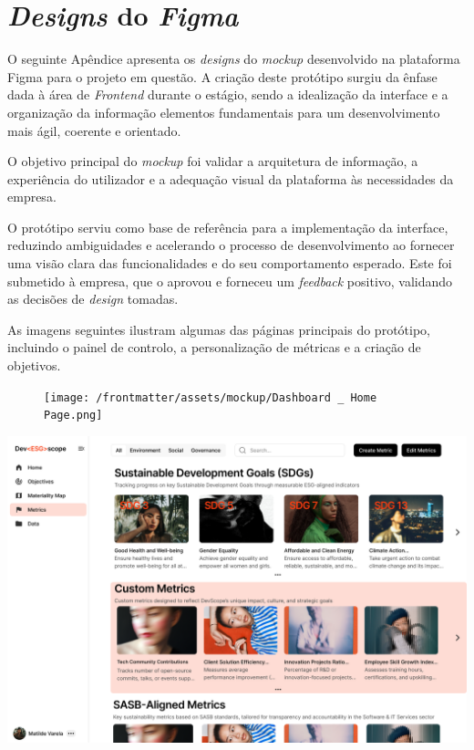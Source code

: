 \chapter{\textit{Designs} do \textit{Figma}}
\label{AppendixC}

O seguinte Apêndice apresenta os \textit{designs} do \textit{mockup}  desenvolvido na plataforma Figma para o projeto em questão. A criação deste protótipo surgiu da ênfase dada à área de \textit{Frontend} durante o estágio, sendo a idealização da interface e a organização da informação elementos fundamentais para um desenvolvimento mais ágil, coerente e orientado.

O objetivo principal do \textit{mockup} foi validar a arquitetura de informação, a experiência do utilizador e a adequação visual da plataforma às necessidades da empresa.

O protótipo serviu como base de referência para a implementação da interface, reduzindo ambiguidades e acelerando o processo de desenvolvimento ao fornecer uma visão clara das funcionalidades e do seu comportamento esperado. Este foi submetido à empresa, que o aprovou e forneceu um \textit{feedback} positivo, validando as decisões de \textit{design} tomadas.

As imagens seguintes ilustram algumas das páginas principais do protótipo, incluindo o painel de controlo, a personalização de métricas e a criação de objetivos.

\begin{figure}[H]
\centering
\texttt{[image: /frontmatter/assets/mockup/Dashboard \_ Home Page.png]}
    \label{fig:dashboardESG}
\end{figure}


\begin{landscape}
\centering
\includegraphics[width=0.9\linewidth]{frontmatter/assets/mockup/Metrics_and_ODS_Customization.png}
\label{fig:metricPage}
\end{landscape}


